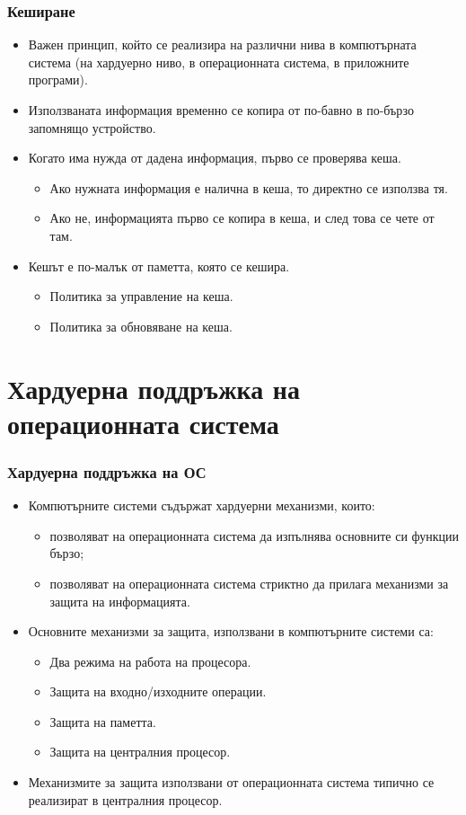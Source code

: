 \documentclass[ignorenonframetext, hyperref=unicode]{beamer}
\begin{document}
\begin{frame}
\frametitle{Кеширане}
\begin{itemize}
\item Важен принцип, който се реализира на различни нива в компютърната система
(на хардуерно ниво, в операционната система, в приложните програми).
\item Използваната информация временно се копира от по-бавно в по-бързо
запомнящо устройство.
\item Когато има нужда от дадена информация, първо се проверява кеша.
\begin{itemize}
  \item Ако нужната информация е налична в кеша, то директно се използва тя.
  \item Ако не, информацията първо се копира в кеша, и след това се чете от там.
\end{itemize}
\item Кешът е по-малък от паметта, която се кешира.
\begin{itemize}
  \item Политика за управление на кеша.
  \item Политика за обновяване на кеша.
\end{itemize} 
\end{itemize}
\end{frame}


\section{Хардуерна поддръжка на операционната система}


\begin{frame}
\frametitle{Хардуерна поддръжка на ОС}
\begin{itemize}
\item Компютърните системи съдържат хардуерни механизми, които:
\begin{itemize}
  \item позволяват на операционната система да изпълнява основните си функции
  бързо;
  \item  позволяват на операционната система стриктно да прилага механизми за
  защита на информацията. 
\end{itemize}
\item Основните механизми за защита, използвани в компютърните системи са:
\begin{itemize}
  \item Два режима на работа на процесора.
  \item Защита на входно/изходните операции.
  \item Защита на паметта.
  \item Защита на централния процесор.
\end{itemize}
\item Механизмите за защита използвани от операционната система типично се
  реализират в централния процесор.
\end{itemize}
\end{frame}
\end{document}
